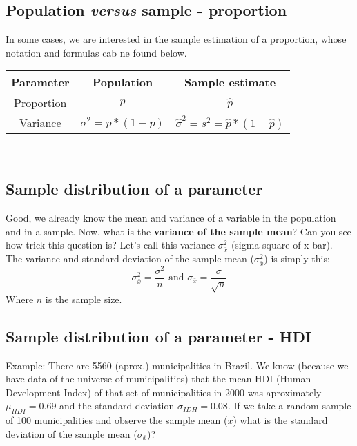 \documentclass[11pt]{article}
\begin{document}
	\subsection*{Population \emph{versus} sample - proportion}
	In some cases, we are interested in the sample estimation of a proportion, whose notation and formulas cab ne found below.\\

\begin{tabular}{|c|c|c|}
\hline
	Parameter & Population & Sample estimate\\ 
\hline
	Proportion & $p$ & $\hat{p}$\\
	Variance & $\sigma^2 = p*(1-p)$ & $\hat{\sigma}^2 = s^2 = \hat{p}*(1-\hat{p})$\\
\hline
\end{tabular}
\newline\\



	\subsection*{Sample distribution of a parameter}

Good, we already know the mean and variance of a variable in the population and in a sample. Now, what is the \textbf{variance of the sample mean}? Can you see how trick this question is? Let's call this variance $\sigma_{\bar{x}}^2$ (sigma square of x-bar).\\
	
	The variance and standard deviation of the sample mean ($\sigma_{\bar{x}}^2$) is simply this:
\[\sigma_{\bar{x}}^2 = \frac{\sigma^2}{n} \text{ and }\sigma_{\bar{x}} = \frac{\sigma}{\sqrt{n}}\]
Where $n$ is the sample size.

	\subsection*{Sample distribution of a parameter - HDI}

Example: There are 5560 (aprox.) municipalities in Brazil. We know (because we have data of the universe of municipalities) that the mean HDI (Human Development Index) of that set of municipalities in 2000 was aproximately $\mu_{HDI}=0.69$ and the standard deviation $\sigma_{IDH} = 0.08$. If we take a random sample of 100 municipalities and observe the sample mean ($\bar{x}$) what is the standard deviation of the sample mean ($\sigma_{\bar{x}}$)?
\end{document}

